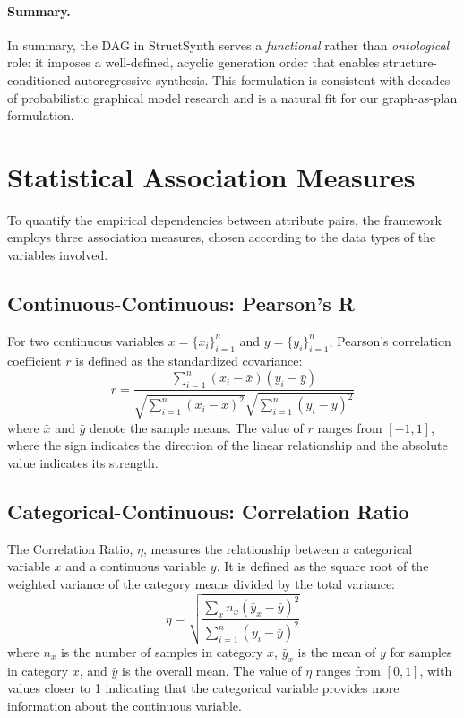 \paragraph{Summary.}
In summary, the DAG in \textsf{StructSynth} serves a \emph{functional} rather than \emph{ontological} role: it imposes a well-defined, acyclic generation order that enables structure-conditioned autoregressive synthesis. This formulation is consistent with decades of probabilistic graphical model research and is a natural fit for our graph-as-plan formulation.

\section{Statistical Association Measures}
\label{sec:association_scores}
\label{app:association_scores}

To quantify the empirical dependencies between attribute pairs, the framework employs three association measures, chosen according to the data types of the variables involved.

\subsection{Continuous-Continuous: Pearson's R}
For two continuous variables $x = \{x_i\}_{i=1}^n$ and $y = \{y_i\}_{i=1}^n$, Pearson's correlation coefficient $r$ is defined as the standardized covariance:
\begin{equation}
    r = \frac{\sum_{i=1}^{n}(x_i-\bar{x})(y_i-\bar{y})}{\sqrt{\sum_{i=1}^{n}(x_i-\bar{x})^2}\sqrt{\sum_{i=1}^{n}(y_i-\bar{y})^2}}
\end{equation}
where $\bar{x}$ and $\bar{y}$ denote the sample means. The value of $r$ ranges from $[-1, 1]$, where the sign indicates the direction of the linear relationship and the absolute value indicates its strength.

\subsection{Categorical-Continuous: Correlation Ratio}
The Correlation Ratio, $\eta$, measures the relationship between a categorical variable $x$ and a continuous variable $y$. It is defined as the square root of the weighted variance of the category means divided by the total variance:
\begin{equation}
    \eta = \sqrt{\frac{\sum_{x} n_x(\bar{y}_x - \bar{y})^2}{\sum_{i=1}^{n}(y_i - \bar{y})^2}}
\end{equation}
where $n_x$ is the number of samples in category $x$, $\bar{y}_x$ is the mean of $y$ for samples in category $x$, and $\bar{y}$ is the overall mean. The value of $\eta$ ranges from $[0, 1]$, with values closer to 1 indicating that the categorical variable provides more information about the continuous variable.

